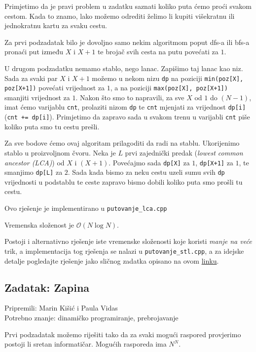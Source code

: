 \documentclass[a4paper]{article}
\begin{document}
Primjetimo da je pravi problem u zadatku saznati koliko puta ćemo proći
svakom cestom. Kada to znamo, lako možemo odrediti želimo li kupiti višekratnu
ili jednokratnu kartu za svaku cestu.

Za prvi podzadatak bilo je dovoljno samo nekim algoritmom poput dfs-a ili bfs-a
pronaći put između $X$ i $X+1$ te brojač svih cesta na putu povećati za $1$.

U drugom podzadatku nemamo stablo, nego lanac. Zapišimo taj lanac kao niz. Sada
za svaki par $X$ i $X+1$ možemo u nekom nizu \texttt{dp} na poziciji
\texttt{min(poz[X], poz[X+1])} povećati vrijednost za $1$, a na poziciji
\texttt{max(poz[X], poz[X+1])} smanjiti vrijednost za $1$. Nakon što smo to
napravili, za sve $X$ od $1$ do $(N-1)$, imat ćemo varijablu \texttt{cnt},
prolaziti nizom \texttt{dp} te \texttt{cnt} mjenjati za vrijednost
\texttt{dp[i]} (\texttt{cnt += dp[i]}). Primjetimo da zapravo sada u svakom
trenu u varijabli \texttt{cnt} piše koliko puta smo tu cestu prešli.

Za sve bodove ćemo ovaj algoritam prilagoditi da radi na stablu.
Ukorijenimo stablo u proizvoljnom čvoru. Neka je $L$ prvi zajednički predak
(\textit{lowest common ancestor (LCA)}) od $X$ i $(X+1)$. Povećajmo sada
\texttt{dp[X]} za $1$, \texttt{dp[X+1]} za $1$,
te smanjimo \texttt{dp[L]} za $2$. Sada kada bismo za neku cestu uzeli sumu svih
\texttt{dp}
vrijednosti u podstablu te ceste zapravo bismo dobili koliko puta smo prošli tu
cestu.

Ovo rješenje je implementirano u \texttt{putovanje\_lca.cpp}

Vremenska složenost je $\mathcal{O}(N \log N)$.

Postoji i alternativno rješenje iste vremenske složenosti koje koristi \textit{
  manje na veće} trik, a implementacija tog rješenja se nalazi u
\texttt{putovanje\_stl.cpp}, a za idejske detalje pogledajte rješenje jako
sličnog zadatka opisano na ovom
\href{https://codeforces.com/blog/entry/72017#comment-563190}{linku}.

\subsection*{Zadatak: Zapina}
\textsf{Pripremili: Marin Kišić i Paula Vidas}\\
\textsf{Potrebno znanje: dinamičko programiranje, prebrojavanje}

Prvi podzadatak možemo riješiti tako da za svaki mogući raspored provjerimo
postoji li sretan informatičar. Mogućih rasporeda ima $N^N$.
\end{document}
